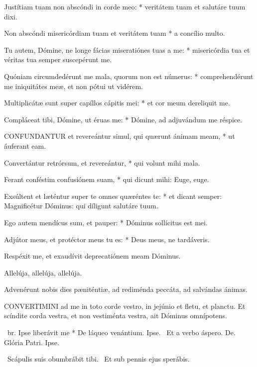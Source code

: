 Justítiam tuam non abscóndi in corde meo: * veritátem tuam et salutáre tuum dixi.

Non abscóndi misericórdiam tuam et veritátem tuam * a concílio multo.

Tu autem, Dómine, ne longe fácias miseratiónes tuas a me: * misericórdia tua et véritas tua semper suscepérunt me.

Quóniam circumdedérunt me mala, quorum non est númerus: * comprehendérunt me iniquitátes meæ, et non pótui ut vidérem.

Multiplicátæ sunt super capíllos cápitis mei: * et cor meum dereliquit me.

Compláceat tibi, Dómine, ut éruas me: * Dómine, ad adjuvándum me réspice.


\lettrine[lines=2]{C}{ONFUNDANTUR} et revereántur simul, qui quærunt ánimam meam, * ut áuferant eam.

Convertántur retrórsum, et revereántur, * qui volunt mihi mala.

Ferant conféstim confusiónem suam, * qui dicunt mihi: Euge, euge.

Exsúltent et læténtur super te omnes quæréntes te: * et dicant semper: Magnificétur Dóminus: qui díligunt salutáre tuum.

Ego autem mendícus sum, et pauper: * Dóminus sollícitus est mei.

Adjútor meus, et protéctor meus tu es: * Deus meus, ne tardáveris.

  Respéxit me, et exaudívit deprecatiónem meam Dóminus.

  Allelúja, allelúja, allelúja.



 Advenérunt nobis dies pæniténtiæ, ad rediménda peccáta, ad salvándas ánimas.


\lettrine[lines=2]{C}{ONVERTIMINI} ad me in toto corde vestro, in jejúnio et fletu, et planctu. Et scíndite corda vestra, et non vestiménta vestra, ait Dóminus omnípotens.

\R\ br. Ipse liberávit me * De láqueo venántium. Ipse. \V\ Et a verbo áspero. De. Glória Patri. Ipse.

\V\ Scápulis suis obumbrábit tibi. \R\ Et sub pennis ejus sperábis.

